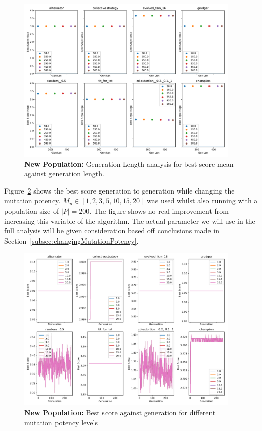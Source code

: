 \begin{figure}[ht]
    \includegraphics[width=0.95\textwidth, keepaspectratio, center]{./img/plots/NEW_GEN_bs_v_gen_all.pdf}
    \caption{\textbf{New Population:} Generation Length analysis for best score mean against generation length.}\label{fig:NEW-GEN-bs-v-gen-all}
\end{figure}

Figure~\ref{fig:NEW-MUT-POT-bs-v-gen-all} shows the best score generation to generation while changing the mutation potency.
\(M_p \in [1,2,3,5,10,15,20] \) was used whilst also running with a population size of \(|P|=200\).
The figure shows no real improvement from increasing this variable of the algorithm.
The actual parameter we will use in the full analysis will be given consideration based off conclusions made in Section~\ref{subsec:changingMutationPotency}.

\begin{figure}[ht]
    \includegraphics[width=0.95\textwidth, keepaspectratio, center]{./img/plots/NEW_MUT_POT_bs_v_gen_all.pdf}
    \caption{\textbf{New Population:} Best score against generation for different mutation potency levels}\label{fig:NEW-MUT-POT-bs-v-gen-all}
\end{figure}


